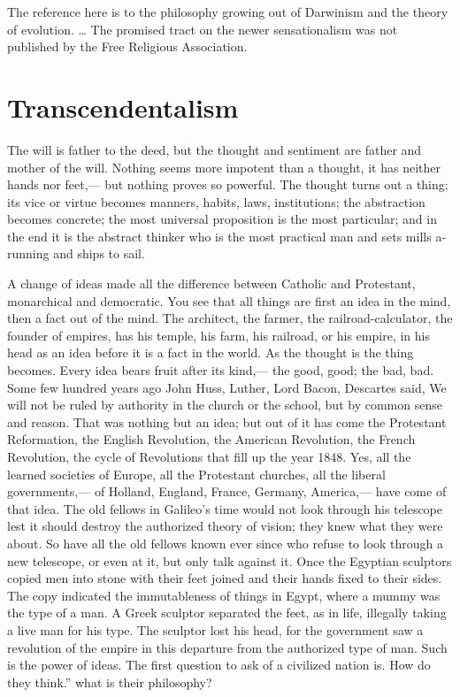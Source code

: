 \documentclass[12pt]{article}
\begin{document}
The reference here is to the philosophy growing out of Darwinism and the theory of evolution.
\ldots
The promised tract on  the newer sensationalism was not published by the Free Religious Association. 

\section*{Transcendentalism}

The will is father to the deed, but the thought and sentiment are father and mother of the will. Nothing seems more impotent than a thought, it has neither hands nor feet,--- but nothing proves so powerful. The thought turns out a thing; its vice or virtue becomes manners, habits, laws, institutions; the abstraction becomes concrete; the most universal proposition is the most particular; and in the end it is the abstract thinker who is the most practical man and sets mills a-running and ships to sail. 

A change of ideas made all the difference between Catholic and Protestant, monarchical and democratic. You see that all things are first an idea in the mind, then a fact out of the mind. The architect, the farmer, the railroad-calculator, the founder of empires, has his temple, his farm, his railroad, or his empire, in his head as an idea before it is a fact in the world. As the thought is the thing becomes. Every idea bears fruit after its kind,--- the good, good; the bad, bad. Some few hundred years ago John Huss, Luther, Lord Bacon, Descartes said, We will not be ruled by authority in the church or the school, but by common sense and reason. That was nothing but an idea; but out of it has come the Protestant Reformation, the English Revolution, the American Revolution, the French Revolution, the cycle of Revolutions that fill up the year 1848. Yes, all the learned societies of Europe, all the Protestant churches, all the liberal governments,--- of Holland, England, France, Germany, America,--- have come of that idea. The old fellows in Galileo's time would not look through his telescope lest it should destroy the authorized theory of vision; they knew what they were about. So have all the old fellows known ever since who refuse to look through a new telescope, or even at it, but only talk against it. Once the Egyptian sculptors copied men into stone with their feet joined and their hands fixed to their sides. The copy indicated the immutableness of things in Egypt, where a mummy was the type of a man. A Greek sculptor separated the feet, as in life, illegally taking a live man for his type. The sculptor lost his head, for the government saw a revolution of the empire in this departure from the authorized type of man. Such is the power of ideas. The first question to ask of a civilized nation is. How do they think.'' what is their philosophy? 
\end{document}

